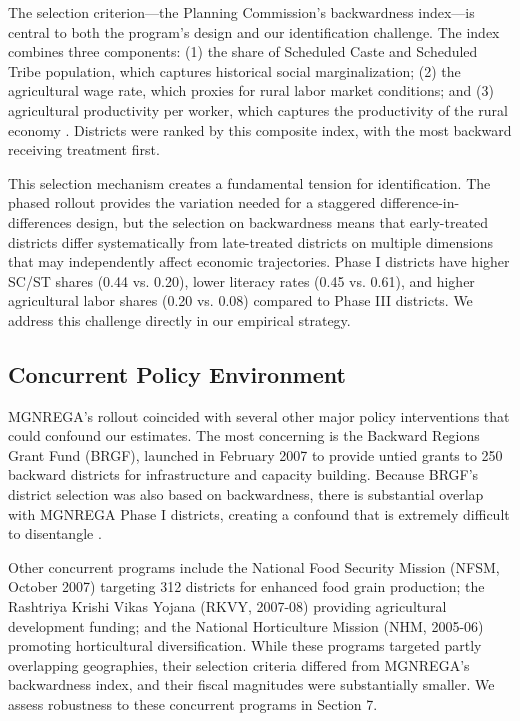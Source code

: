\documentclass[12pt]{article}
\begin{document}
The selection criterion---the Planning Commission's backwardness index---is central to both the program's design and our identification challenge. The index combines three components: (1) the share of Scheduled Caste and Scheduled Tribe population, which captures historical social marginalization; (2) the agricultural wage rate, which proxies for rural labor market conditions; and (3) agricultural productivity per worker, which captures the productivity of the rural economy \citep{planning_commission2003}. Districts were ranked by this composite index, with the most backward receiving treatment first.

This selection mechanism creates a fundamental tension for identification. The phased rollout provides the variation needed for a staggered difference-in-differences design, but the selection on backwardness means that early-treated districts differ systematically from late-treated districts on multiple dimensions that may independently affect economic trajectories. Phase I districts have higher SC/ST shares (0.44 vs. 0.20), lower literacy rates (0.45 vs. 0.61), and higher agricultural labor shares (0.20 vs. 0.08) compared to Phase III districts. We address this challenge directly in our empirical strategy.

\subsection{Concurrent Policy Environment}

MGNREGA's rollout coincided with several other major policy interventions that could confound our estimates. The most concerning is the Backward Regions Grant Fund (BRGF), launched in February 2007 to provide untied grants to 250 backward districts for infrastructure and capacity building. Because BRGF's district selection was also based on backwardness, there is substantial overlap with MGNREGA Phase I districts, creating a confound that is extremely difficult to disentangle \citep{planning_commission2007brgf}.

Other concurrent programs include the National Food Security Mission (NFSM, October 2007) targeting 312 districts for enhanced food grain production; the Rashtriya Krishi Vikas Yojana (RKVY, 2007-08) providing agricultural development funding; and the National Horticulture Mission (NHM, 2005-06) promoting horticultural diversification. While these programs targeted partly overlapping geographies, their selection criteria differed from MGNREGA's backwardness index, and their fiscal magnitudes were substantially smaller. We assess robustness to these concurrent programs in Section 7.
\end{document}
